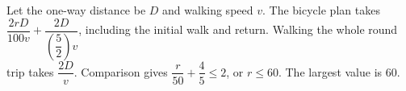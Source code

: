 Let the one-way distance be $D$ and walking speed $v$. The bicycle plan takes $\dfrac{2rD}{100v}+\dfrac{2D}{(\dfrac{5}{2})v}$, including the initial walk and return. Walking the whole round trip takes $\dfrac{2D}{v}$. Comparison gives $\dfrac{r}{50}+\dfrac{4}{5}\le2$, or $r\le60$. The largest value is $\boxed{60}$.

